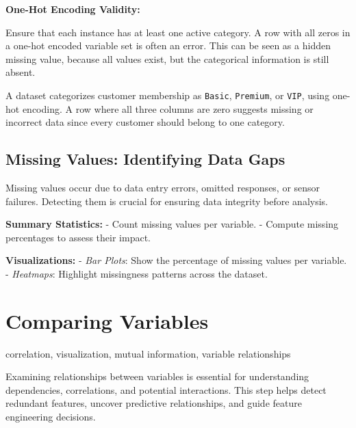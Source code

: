 \documentclass[12pt,openany, draft]{book}
\begin{document}
\textbf{One-Hot Encoding Validity:}

Ensure that each instance has at least one active category. A row with all zeros in a one-hot encoded variable set is often an error. This can be seen as a hidden missing value, because all values exist, but the categorical information is still absent.

\begin{examplebox}
A dataset categorizes customer membership as \texttt{Basic}, \texttt{Premium}, or \texttt{VIP}, using one-hot encoding. A row where all three columns are zero suggests missing or incorrect data since every customer should belong to one category.
\end{examplebox}


\subsection{Missing Values: Identifying Data Gaps}

Missing values occur due to data entry errors, omitted responses, or sensor failures. 
Detecting them is crucial for ensuring data integrity before analysis.
\newline

\textbf{Summary Statistics:}  
\newline
- Count missing values per variable.  
- Compute missing percentages to assess their impact.  
\newline

\textbf{Visualizations:}  
\newline
- \textit{Bar Plots}: Show the percentage of missing values per variable.  
- \textit{Heatmaps}: Highlight missingness patterns across the dataset.  
\newline



\section{Comparing Variables}

\begin{keywordsbox}
correlation, visualization, mutual information, variable relationships
\end{keywordsbox}

Examining relationships between variables is essential for understanding dependencies, correlations, and potential interactions. This step helps detect redundant features, uncover predictive relationships, and guide feature engineering decisions. 
\end{document}
